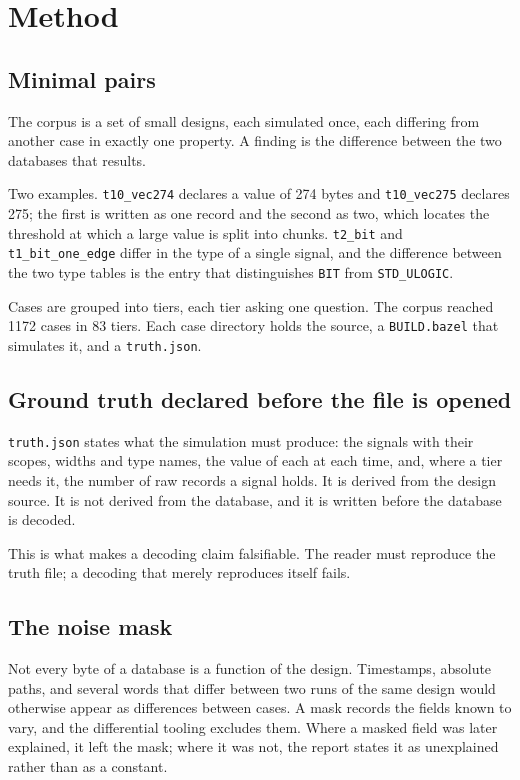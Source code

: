\section{Method}
\label{sec:method}

\subsection{Minimal pairs}

The corpus is a set of small designs, each simulated once, each
differing from another case in exactly one property. A finding is the
difference between the two databases that results.

Two examples. \texttt{t10\_vec274} declares a value of 274 bytes and
\texttt{t10\_vec275} declares 275; the first is written as one record
and the second as two, which locates the threshold at which a large
value is split into chunks. \texttt{t2\_bit} and
\texttt{t1\_bit\_one\_edge} differ in the type of a single signal, and
the difference between the two type tables is the entry that
distinguishes \texttt{BIT} from \texttt{STD\_ULOGIC}.

Cases are grouped into tiers, each tier asking one question. The
corpus reached 1172 cases in 83 tiers. Each case directory holds the
source, a \texttt{BUILD.bazel} that simulates it, and a
\texttt{truth.json}.

\subsection{Ground truth declared before the file is opened}

\texttt{truth.json} states what the simulation must produce: the
signals with their scopes, widths and type names, the value of each at
each time, and, where a tier needs it, the number of raw records a
signal holds. It is derived from the design source. It is not derived
from the database, and it is written before the database is decoded.

This is what makes a decoding claim falsifiable. The reader must
reproduce the truth file; a decoding that merely reproduces itself
fails.

\subsection{The noise mask}

Not every byte of a database is a function of the design. Timestamps,
absolute paths, and several words that differ between two runs of the
same design would otherwise appear as differences between cases. A
mask records the fields known to vary, and the differential tooling
excludes them. Where a masked field was later explained, it left the
mask; where it was not, the report states it as unexplained rather
than as a constant.

